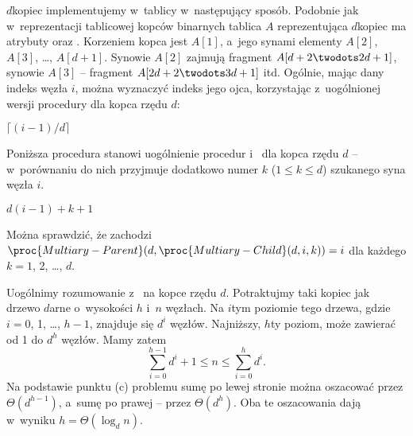 
\subproblem %
$d$\nbhyphen kopiec implementujemy w~tablicy w~następujący sposób.
Podobnie jak w~reprezentacji tablicowej kopców binarnych tablica $A$ reprezentująca $d$\nbhyphen kopiec ma atrybuty  oraz .
Korzeniem kopca jest $A[1]$, a~jego synami elementy $A[2]$, $A[3]$, \dots, $A[d+1]$.
Synowie $A[2]$ zajmują fragment $A[d+2\twodots2d+1]$, synowie $A[3]$ -- fragment $A[2d+2\twodots3d+1]$ itd.
Ogólnie, mając dany indeks węzła $i$, można wyznaczyć indeks jego ojca, korzystając z~uogólnionej wersji procedury  dla kopca rzędu $d$:
\begin{codebox}
\zi	\Return $\lceil(i-1)/d\rceil$
\end{codebox}

Poniższa procedura stanowi uogólnienie procedur  i~ dla kopca rzędu $d$ -- w~porównaniu do nich przyjmuje dodatkowo numer $k$ ($1\le k\le d$) szukanego syna węzła $i$.
\begin{codebox}
\zi	\Return $d(i-1)+k+1$
\end{codebox}

Można sprawdzić, że zachodzi $\proc{Multiary-Parent}(d,\proc{Multiary-Child}(d,i,k))=i$ dla każdego $k=1$, 2, \dots, $d$.

\subproblem %
Uogólnimy rozumowanie z~ na kopce rzędu $d$.
Potraktujmy taki kopiec jak drzewo $d$\nbhyphen arne o~wysokości $h$ i~$n$ węzłach.
Na $i$\nbhyphen tym poziomie tego drzewa, gdzie $i=0$, 1, \dots, $h-1$, znajduje się $d^i$ węzłów.
Najniższy, $h$\nbhyphen ty poziom, może zawierać od 1 do $d^h$ węzłów.
Mamy zatem
\[
    \sum_{i=0}^{h-1}d^i+1 \le n \le \sum_{i=0}^hd^i.
\]
Na podstawie punktu (c) problemu  sumę po lewej stronie można oszacować przez $\Theta(d^{h-1})$, a~sumę po prawej -- przez $\Theta(d^h)$.
Oba te oszacowania dają w~wyniku $h=\Theta(\log_dn)$.

